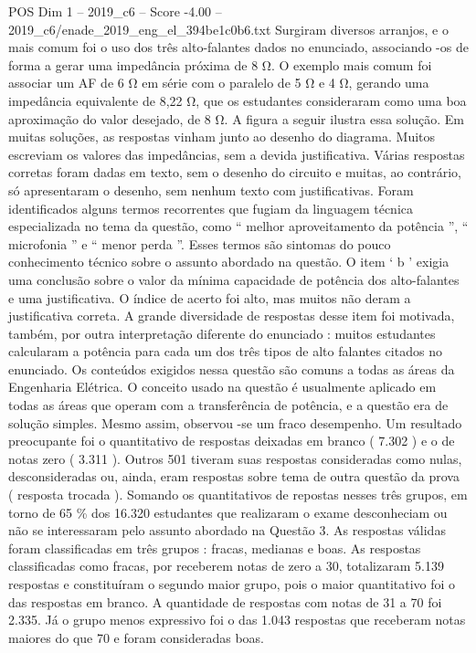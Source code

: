 \begin{textsample}{POS Dim 1 – 2019\_c6 – Score -4.00 – 2019\_c6/enade\_2019\_eng\_el\_394be1c0b6.txt}
Surgiram diversos arranjos, e o mais comum foi o uso dos três alto-falantes dados no enunciado, associando -os de forma a gerar uma impedância próxima de 8 Ω.
O exemplo mais comum foi associar um AF de 6 Ω em série com o paralelo de 5 Ω e 4 Ω, gerando uma impedância equivalente de 8,22 Ω, que os estudantes consideraram como uma boa aproximação do valor desejado, de 8 Ω.
A figura a seguir ilustra essa solução.
Em muitas soluções, as respostas vinham junto ao desenho do diagrama.
Muitos escreviam os valores das impedâncias, sem a devida justificativa.
Várias respostas corretas foram dadas em texto, sem o desenho do circuito e muitas, ao contrário, só apresentaram o desenho, sem nenhum texto com justificativas.
Foram identificados alguns termos recorrentes que fugiam da linguagem técnica especializada no tema da questão, como “ melhor aproveitamento da potência ”, “ microfonia ” e “ menor perda ”.
Esses termos são sintomas do pouco conhecimento técnico sobre o assunto abordado na questão.
O item ‘ b ’ exigia uma conclusão sobre o valor da mínima capacidade de potência dos alto-falantes e uma justificativa.
O índice de acerto foi alto, mas muitos não deram a justificativa correta.
A grande diversidade de respostas desse item foi motivada, também, por outra interpretação diferente do enunciado : muitos estudantes calcularam a potência para cada um dos três tipos de alto falantes citados no enunciado.
Os conteúdos exigidos nessa questão são comuns a todas as áreas da Engenharia Elétrica.
O conceito usado na questão é usualmente aplicado em todas as áreas que operam com a transferência de potência, e a questão era de solução simples.
Mesmo assim, observou -se um fraco desempenho.
Um resultado preocupante foi o quantitativo de respostas deixadas em branco ( 7.302 ) e o de notas zero ( 3.311 ).
Outros 501 tiveram suas respostas consideradas como nulas, desconsideradas ou, ainda, eram respostas sobre tema de outra questão da prova ( resposta trocada ).
Somando os quantitativos de repostas nesses três grupos, em torno de 65 \% dos 16.320 estudantes que realizaram o exame desconheciam ou não se interessaram pelo assunto abordado na Questão 3.
As respostas válidas foram classificadas em três grupos : fracas, medianas e boas.
As respostas classificadas como fracas, por receberem notas de zero a 30, totalizaram 5.139 respostas e constituíram o segundo maior grupo, pois o maior quantitativo foi o das respostas em branco.
A quantidade de respostas com notas de 31 a 70 foi 2.335.
Já o grupo menos expressivo foi o das 1.043 respostas que receberam notas maiores do que 70 e foram consideradas boas.

\end{textsample}
